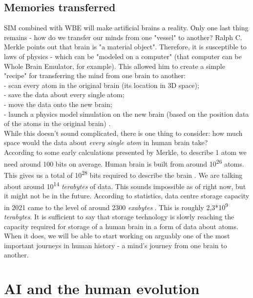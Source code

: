 \documentclass[12pt]{article}
\begin{document}
\subsection{Memories transferred}
	SIM combined with WBE will make artificial brains a reality. Only one last thing remains - how do we transfer our minds from one "vessel" to another? Ralph C. Merkle points out that brain is "a material object". Therefore, it is susceptible to laws of physics - which can be "modeled on a computer" \cite{uploading:1} (that computer can be Whole Brain Emulator, for example). This allowed him to create a simple "recipe" for transferring the mind from one brain to another:
	\\- scan every atom in the original brain (its location in 3D space);
	\\- save the data about every single atom;
	\\- move the data onto the new brain;
	\\- launch a physics model simulation on the new brain (based on the position data of the atoms in the original brain) \cite{uploading:1}.
	\\While this doesn't sound complicated, there is one thing to consider: how much space would the data about \emph{every single atom} in human brain take? 
	\\According to some early calculations presented by Merkle, to describe 1 atom we need around 100 bits on average. Human brain is built from around 10\textsuperscript{26} atoms. This gives us a total of 10\textsuperscript{28} bits required to describe the brain \cite{uploading:1}. We are talking about around 10\textsuperscript{14} \emph{terabytes} of data. This sounds impossible as of right now, but it might not be in the future. According to statistics, data centre storage capacity in 2021 came to the level of around 2300 \emph{exabytes} \cite{statista:capacity}. This is roughly 2,3*10\textsuperscript{9} \emph{terabytes}. It is sufficient to say that storage technology is slowly reaching the capacity required for storage of a human brain in a form of data about atoms. When it does, we will be able to start working on arguably one of the most important journeys in human history - a mind's journey from one brain to another.
\section{AI and the human evolution}
\end{document}
